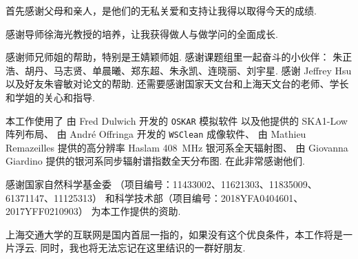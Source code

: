 
\begin{thanks}

首先感谢父母和亲人，是他们的无私关爱和支持让我得以取得今天的成绩.

感谢导师徐海光教授的培养，让我获得做人与做学问的全面成长.

感谢师兄师姐的帮助，特别是王婧颖师姐.
感谢课题组里一起奋斗的小伙伴：
朱正浩、胡丹、马志贤、单晨曦、郑东超、朱永凯、连晓丽、刘宇星.
感谢 Jeffrey Hsu 以及好友朱睿敏对论文的帮助.
还需要感谢国家天文台和上海天文台的老师、学长和学姐的关心和指导.

本工作使用了
由 Fred Dulwich 开发的 \texttt{OSKAR} 模拟软件
以及他提供的 SKA1-Low 阵列布局、
由 André Offringa 开发的 \texttt{WSClean} 成像软件、
由 Mathieu Remazeilles 提供的高分辨率 Haslam \SI{408}{\MHz}
银河系全天辐射图、
由 Giovanna Giardino 提供的银河系同步辐射谱指数全天分布图.
在此非常感谢他们.

感谢国家自然科学基金委
（项目编号：11433002、11621303、11835009、61371147、11125313）
和科学技术部（项目编号：2018YFA0404601、2017YFF0210903）
为本工作提供的资助.

上海交通大学的互联网是国内首屈一指的，如果没有这个优良条件，本工作将是一片浮云.
同时，我也将无法忘记在这里结识的一群好朋友.


\end{thanks}
